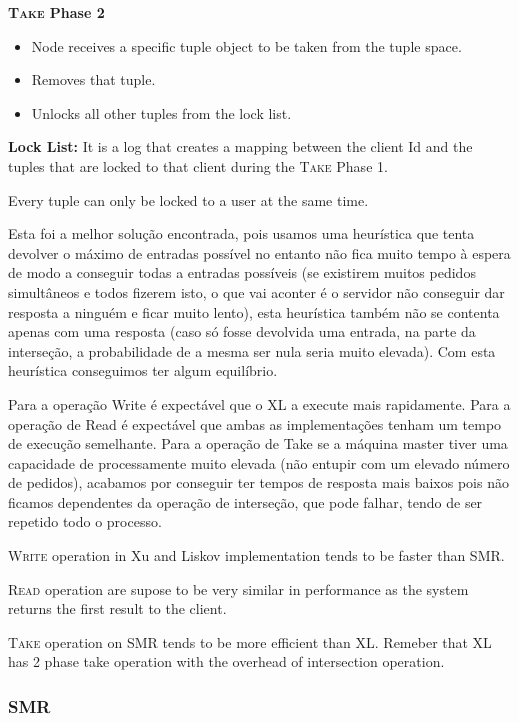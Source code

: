 \documentclass[times, 10pt,twocolumn]{article}
\begin{document}
\textbf{\textsc{Take} Phase 2}
\begin{itemize}
   \item Node receives a specific tuple object to be taken from the tuple space.
   \item Removes that tuple.
   \item Unlocks all other tuples from the lock list.
\end{itemize}

\textbf{Lock List:} It is a log that creates a mapping between the client Id and the
tuples that are locked to that client during the \textsc{Take} Phase 1.

Every tuple can only be locked to a user at the same time.

Esta foi a melhor solução encontrada, pois usamos uma heurística que tenta devolver o máximo de entradas
possível no entanto não fica muito tempo à espera de modo a conseguir todas a entradas possíveis (se existirem
muitos pedidos simultâneos e todos fizerem isto, o que vai aconter é o servidor não conseguir dar resposta a ninguém
e ficar muito lento), esta heurística também não se contenta apenas com uma resposta (caso só fosse devolvida uma entrada,
na parte da interseção, a probabilidade de a mesma ser nula seria muito elevada). Com esta heurística conseguimos
ter algum equilíbrio.



Para a operação Write é expectável que o XL a execute mais rapidamente.
Para a operação de Read é expectável que ambas as implementações tenham um tempo de execução semelhante.
Para a operação de Take se a máquina master tiver uma capacidade de processamente muito elevada (não entupir com
um elevado número de pedidos), acabamos por conseguir ter tempos de resposta mais baixos pois não ficamos dependentes
da operação de interseção, que pode falhar, tendo de ser repetido todo o processo.

\textsc{Write} operation in Xu and Liskov implementation tends to be faster than SMR. %

\textsc{Read} operation are supose to be very similar in performance as the system returns the first result to the client.

\textsc{Take} operation on SMR tends to be more efficient than XL. Remeber that XL has 2 phase take operation with the overhead of intersection operation.


\subsubsection{SMR}
\end{document}
